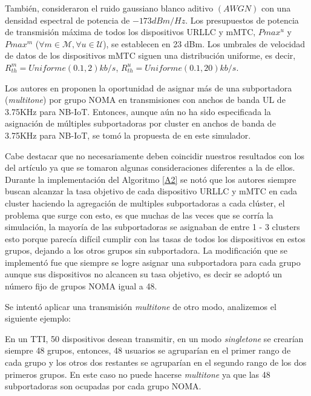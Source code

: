 También, consideraron el ruido gaussiano blanco aditivo $(AWGN)$ con una densidad espectral de potencia de $-173 dBm / Hz$. Los presupuestos de potencia de transmisión máxima de todos los dispositivos URLLC y mMTC, $Pmax ^{u}$ y $Pmax ^{m}$ ($\forall m \in \mathcal {M} , \forall u \in \mathcal {U}$), se establecen en 23 dBm. Los umbrales de velocidad de datos de los dispositivos mMTC siguen una distribución uniforme, es decir, $R_{th}^{ m} = Uniforme (0.1, 2) kb / s$, $R_{th}^{u} = Uniforme (0.1, 20) kb / s$.\newline

Los autores en \parencite{Shahini2019} proponen la oportunidad de asignar más de una subportadora (\textit{multitone}) por grupo NOMA en transmisiones con anchos de banda UL de 3.75KHz para NB-IoT. Entonces, aunque aún no ha sido especificada la asignación de múltiples subportadoras por cluster en anchos de banda de 3.75KHz para NB-IoT, se tomó la propuesta de \parencite{Shahini2019} en este simulador. \newline

Cabe destacar que no necesariamente deben coincidir nuestros resultados con los del artículo ya que se tomaron algunas consideraciones diferentes a la de ellos. Durante la implementación del Algoritmo \ref{A2} se notó que los autores \parencite{Shahini2019} siempre buscan alcanzar la tasa objetivo de cada dispositivo URLLC y mMTC en cada cluster haciendo la agregación de multiples subportadoras a cada clúster, el problema que surge con esto, es que muchas de las veces que se corría la simulación, la mayoría de las subportadoras se asignaban de entre 1 - 3 clusters esto porque parecía difícil cumplir con las tasas de todos los dispositivos en estos grupos, dejando a los otros grupos sin subportadora. La modificación que se implementó fue que siempre se logre asignar una subportadora para cada grupo aunque sus dispositivos no alcancen su tasa objetivo, es decir se adoptó un número fijo de grupos NOMA igual a 48. \newline

Se intentó aplicar una transmisión \textit{multitone} de otro modo, analizemos el siguiente ejemplo: \newline

En un TTI, 50 dispositivos desean transmitir, en un modo \textit{singletone} se crearían siempre 48 grupos, entonces, 48 usuarios se agruparían en el primer rango de cada grupo y los otros dos restantes se agruparían en el segundo rango de los dos primeros grupos. En este caso no puede hacerse \textit{multitone} ya que las 48 subportadoras son ocupadas por cada grupo NOMA. \newline

